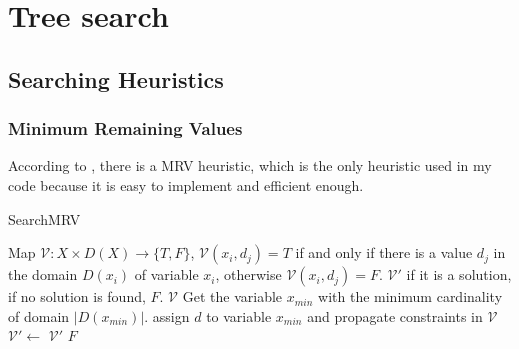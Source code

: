 \documentclass[a4paper, 12pt]{report}
\begin{document}
\chapter {Tree search}

    \section {Searching Heuristics}
        \subsection {Minimum Remaining Values}
            According to \cite{golomb1965backtrack}, there is a MRV heuristic, which is the only heuristic used in my code because it is easy to implement and efficient enough.
            \begin{algorithm}
                \caption{SearchMRV}
                \label{MRV}
                \begin{algorithmic}[1]
                    \Require Map $\mathcal V:X\times D(X) \to \{T,F\}$, $\mathcal V(x_i,d_j)=T$ if and only if there is a value $d_j$ in the domain $D(x_i)$ of variable $x_i$, otherwise $\mathcal V(x_i,d_j)=F$. 
                    \Ensure $\mathcal V'$ if it is a solution, if no solution is found, $F$.
                            \State \Return $\mathcal V$
                        \EndIf
                        \State Get the variable $x_{min}$ with the minimum cardinality of domain $|D(x_{min})|$.
                            \State assign $d$ to variable $x_{min}$ and propagate constraints in $\mathcal V$
                                \State $\mathcal V'\gets$ 
                                    \State \Return $\mathcal V'$
                                \EndIf
                            \EndIf
                        \EndFor
                        \State \Return $F$
                    \EndFunction
                \end{algorithmic}
            \end{algorithm}
\end{document}
